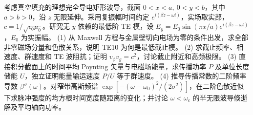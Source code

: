 考虑真空填充的理想完全导电矩形波导，截面 \(0<x<a,\ 0<y<b\)，其中 \(a>b>0\)，沿 \(z\) 无限延伸。采用复振幅时间约定 \(e^{i(\beta z-\omega t)}\)，实场取实部，\(c=1/\sqrt{\epsilon_0\mu_0}\)。研究无 \(y\) 依赖的最低阶 TE 模，设 \(E_y=E_0\sin(\pi x/a)e^{i(\beta z-\omega t)}\)，\(E_0\) 为实振幅。
(1) 从 Maxwell 方程与金属壁切向电场为零的条件出发，求全部非零磁场分量和色散关系，说明 TE10 为何是最低截止模。
(2) 求截止频率、相速度、群速度和 TE 波阻抗；证明 \(v_\phi v_g=c^2\)，讨论截止附近和高频极限。
(3) 直接积分截面上的时间平均 Poynting 矢量与电磁场能量，求传播功率 \(P\) 及单位长度储能 \(U\)，独立证明能量输运速度 \(P/U\) 等于群速度。
(4) 推导传播常数的二阶频率导数 \(\beta''(\omega)\)。对窄带高斯频谱 \(\exp[-(\omega-\omega_0)^2/(2\sigma^2)]\)，在二阶色散近似下求脉冲强度的均方根时间宽度随距离的变化；并讨论 \(\omega<\omega_c\) 的半无限波导倏逝解及平均轴向功率。
